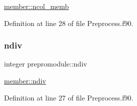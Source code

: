 \hyperlink{namespacemember_a20895477b227a3352a4e758b21b01bf8}{member\+::ncol\+\_\+memb} 



Definition at line 28 of file Preprocess.\+f90.

\mbox{\label{namespaceprepromodule_a6339275501f8c1e8f0b418c9e918005e}} 
\subsubsection{\texorpdfstring{ndiv}{ndiv}}
{\footnotesize\ttfamily integer prepromodule\+::ndiv\hspace{0.3cm}{\ttfamily [private]}}



\hyperlink{namespacemember_a3e6a3b0896edb5c30c113dc22ab7181a}{member\+::ndiv} 



Definition at line 27 of file Preprocess.\+f90.

